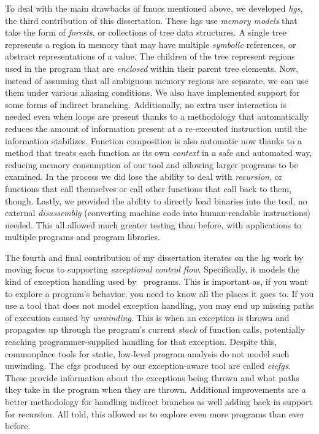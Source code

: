 {  To deal with the main drawbacks of \acp{fmuc} mentioned above, we developed \emph{\acfp{hg}}, the third contribution of this dissertation.
  These \acp{hg} use \emph{memory models} that take the form of \emph{forests}, or collections of tree data structures.
  A single tree represents a region in memory that may have multiple \emph{symbolic} references, or abstract representations of a value.
  The children of the tree represent regions used in the program that are \emph{enclosed} within their parent tree elements.
  Now, instead of assuming that all ambiguous memory regions are separate, we can use them under various aliasing conditions.
  We also have implemented support for some forms of indirect branching.
  Additionally, no extra user interaction is needed even when loops are present thanks to a methodology that automatically reduces the amount of information present at a re-executed instruction until the information stabilizes.
  Function composition is also automatic now thanks to a method that treats each function as its own \emph{context} in a safe and automated way, reducing memory consumption of our tool and allowing larger programs to be examined.
  In the process we did lose the ability to deal with \emph{recursion}, or functions that call themselves or call other functions that call back to them, though.
  Lastly, we provided the ability to directly load binaries into the tool, no external \emph{disassembly} (converting machine code into human-readable instructions) needed.
  This all allowed much greater testing than before, with applications to multiple programs and program libraries.

  The fourth and final contribution of my dissertation iterates on the \ac{hg} work by moving focus to supporting \emph{exceptional control flow}.
  Specifically, it models the kind of exception handling used by \Cpp\ programs.
  This is important as, if you want to explore a program's behavior, you need to know all the places it goes to.
  If you use a tool that does not model exception handling, you may end up missing paths of execution caused by \emph{unwinding}.
  This is when an exception is thrown and propagates up through the program's current \emph{stack} of function calls, potentially reaching programmer-supplied handling for that exception.
  Despite this, commonplace tools for static, low-level program analysis do not model such unwinding.
  The \acp{cfg} produced by our exception-aware tool are called \emph{\acfp{eicfg}}.
  These provide information about the exceptions being thrown and what paths they take in the program when they are thrown.
  Additional improvements are a better methodology for handling indirect branches as well adding back in support for recursion.
  All told, this allowed us to explore even more programs than ever before.
}

